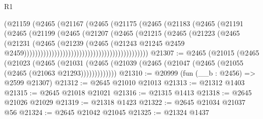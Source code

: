\begin{lexlean}{R1}
\begin{coremodule}
                                                (@21159
                                                  (@2465
                                                    (@21167
                                                      (@2465
                                                        (@21175
                                                          (@2465
                                                            (@21183
                                                              (@2465
                                                                (@21191
                                                                  (@2465
                                                                    (@21199
                                                                      (@2465
                                                                        (@21207
                                                                          (@2465
                                                                            (@21215
                                                                              (@2465
                                                                                (@21223
                                                                                  (@2465
                                                                                    (@21231
                                                                                      (@2465
                                                                                        (@21239
                                                                                          (@2465
                                                                                            (@21243
                                                                                              @21245
                                                                                              @2459
                                                                                              @2459)))))))))))))))))))))))))))))))))))))))))))))
@21307 := @2465
    (@21015
      (@2465
        (@21023
          (@2465
            (@21031 (@2465 (@21039 (@2465 (@21047 (@2465 (@21055 (@2465 (@21063 @21293)))))))))))))
@21310 := @20999 (fun (__b : @2456) => @2599 @21307)
@21312 := @2645 @21010 @21013
@21313 := @21312 @1403
@21315 := @2645 @21018 @21021
@21316 := @21315 @1413
@21318 := @2645 @21026 @21029
@21319 := @21318 @1423
@21322 := @2645 @21034 @21037 @56
@21324 := @2645 @21042 @21045
@21325 := @21324 @1437

\end{coremodule}
\end{lexlean}
